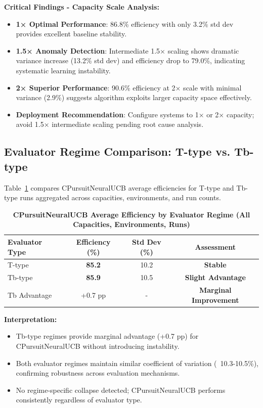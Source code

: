 \documentclass[12pt,a4paper]{article}
\newcommand{\performance}[1]{\textcolor{performancecolor}{\textbf{#1}}}
\newcommand{\critical}[1]{\textcolor{criticalcolor}{\textbf{#1}}}
\newcommand{\success}[1]{\textcolor{successcolor}{\textbf{#1}}}
\begin{document}
\textbf{Critical Findings - Capacity Scale Analysis:}
\begin{itemize}
\item \success{1× Optimal Performance}: 86.8\% efficiency with only 3.2\% std dev provides excellent baseline stability.
\item \critical{1.5× Anomaly Detection}: Intermediate 1.5× scaling shows dramatic variance increase (13.2\% std dev) and efficiency drop to 79.0\%, indicating systematic learning instability.
\item \success{2× Superior Performance}: 90.6\% efficiency at 2× scale with minimal variance (2.9\%) suggests algorithm exploits larger capacity space effectively.
\item \critical{Deployment Recommendation}: Configure systems to 1× or 2× capacity; avoid 1.5× intermediate scaling pending root cause analysis.
\end{itemize}

\subsection{Evaluator Regime Comparison: T-type vs. Tb-type}

Table~\ref{tab:regime-comparison} compares CPursuitNeuralUCB average efficiencies for T-type and Tb-type runs aggregated across capacities, environments, and run counts.

\begin{table}[H]
\centering
\caption{\performance{CPursuitNeuralUCB Average Efficiency by Evaluator Regime (All Capacities, Environments, Runs)}}
\label{tab:regime-comparison}
\begin{tabular}{|l|c|c|c|}
\hline
\textbf{Evaluator Type} & \textbf{Efficiency (\%)} & \textbf{Std Dev (\%)} & \textbf{Assessment} \\
\hline
\hline
T-type & \performance{85.2} & 10.2 & \success{Stable} \\
Tb-type & \performance{85.9} & 10.5 & \success{Slight Advantage} \\
Tb Advantage & +0.7 pp & - & \success{Marginal Improvement} \\
\hline
\end{tabular}
\end{table}

\textbf{Interpretation:}
\begin{itemize}
\item Tb-type regimes provide marginal advantage (+0.7 pp) for CPursuitNeuralUCB without introducing instability.
\item Both evaluator regimes maintain similar coefficient of variation (~10.3-10.5\%), confirming robustness across evaluation mechanisms.
\item No regime-specific collapse detected; CPursuitNeuralUCB performs consistently regardless of evaluator type.
\end{itemize}
\end{document}
